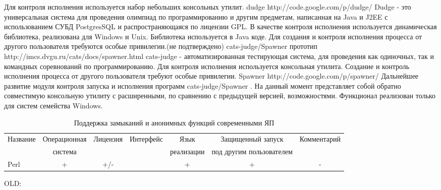 \documentclass{imcs}
\begin{document}
Для контроля исполнения используется набор небольших консольных утилит.
dudge http://code.google.com/p/dudge/
Dudge - это универсальная система для проведения олимпиад по программированию и другим предметам, написанная на Java и J2EE с использованием СУБД PostgresSQL и распространяющаяся по лицензии GPL. 
В качестве контроля исполнения используется динамическая библиотека, реализована для Windows и Unix. Библиотека используется в Java коде. Для создания и контроля исполнения процесса от другого пользователя требуются особые привилегии.(не подтверждено)
cats-judge/Spawner прототип http://imcs.dvgu.ru/cats/docs/spawner.html
cats-judge - автоматизированная тестирующая система, для проведения как одиночных, так и командных соревнований по программированию.
Для контроля исполнения используется консольная утилита. Создание и контроль исполнения процесса от другого пользователя требуют особые привилегии.
Spawner http://code.google.com/p/spawner/
Дальнейшее развитие модуля контроля запуска и исполнения программ cats-judge/Spawner .
На данный момент представляет собой обратно совместимую консольную утилиту с расширенными, по сравнению с предыдущей версией, возможностями.
Функционал реализован только для систем семейства Windows.

\begin{table}[h!]
\begin{center}
\begin{tabular}{|l|c|c|c|c|c|c|}
\hline
  Название   &  Операционная  &  Лицензия  &  Интерфейс  &  Язык	 		&  Защищенный запуск 	  & Комментарий \\
         	&  система    	 &      		  &  	   		&  реализации   	& под другим пользователем &	           \\
\hline
 Perl    &  +          &  +/-        &             &  +          &  +   &   -    \\
\hline
\end{tabular}
\caption{Поддержка замыканий и анонимных функций современными ЯП}\label{tab:wsi_diff_rel}
\end{center}
\end{table}
 
\iffalse OLD: 
 
\end{document}
